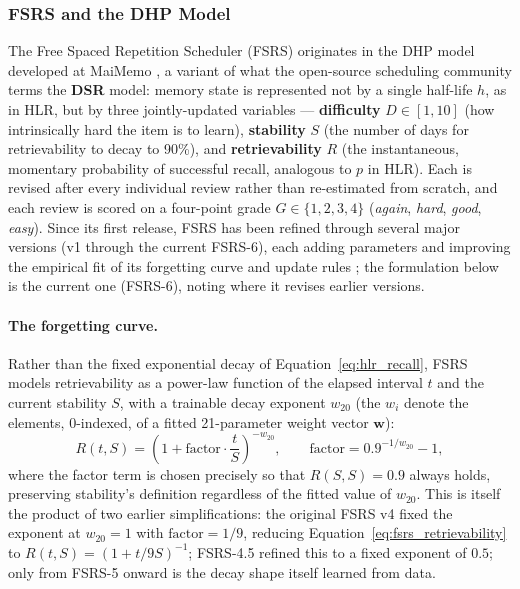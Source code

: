         \subsubsection{FSRS and the DHP Model}
        \label{subsubsec:fsrs}
        The Free Spaced Repetition Scheduler (FSRS) originates in the DHP model developed at MaiMemo \cite{ye2022stochastic}, a variant of what the open-source scheduling community terms the \textbf{DSR} model: memory state is represented not by a single half-life $h$, as in HLR, but by three jointly-updated variables --- \textbf{difficulty} $D \in [1, 10]$ (how intrinsically hard the item is to learn), \textbf{stability} $S$ (the number of days for retrievability to decay to 90\%), and \textbf{retrievability} $R$ (the instantaneous, momentary probability of successful recall, analogous to $p$ in HLR). Each is revised after every individual review rather than re-estimated from scratch, and each review is scored on a four-point grade $G \in \{1,2,3,4\}$ (\emph{again}, \emph{hard}, \emph{good}, \emph{easy}). Since its first release, FSRS has been refined through several major versions (v1 through the current FSRS-6), each adding parameters and improving the empirical fit of its forgetting curve and update rules \cite{opensr2026algorithm}; the formulation below is the current one (FSRS-6), noting where it revises earlier versions.

        \paragraph{The forgetting curve.} Rather than the fixed exponential decay of Equation~\ref{eq:hlr_recall}, FSRS models retrievability as a power-law function of the elapsed interval $t$ and the current stability $S$, with a trainable decay exponent $w_{20}$ (the $w_i$ denote the elements, $0$-indexed, of a fitted 21-parameter weight vector $\mathbf{w}$):
        \begin{equation}
            \label{eq:fsrs_retrievability}
            R(t, S) = \left(1 + \text{factor} \cdot \frac{t}{S}\right)^{-w_{20}}, \qquad \text{factor} = 0.9^{-1/w_{20}} - 1,
        \end{equation}
        where the factor term is chosen precisely so that $R(S, S) = 0.9$ always holds, preserving stability's definition regardless of the fitted value of $w_{20}$. This is itself the product of two earlier simplifications: the original FSRS v4 fixed the exponent at $w_{20}=1$ with $\text{factor}=1/9$, reducing Equation~\ref{eq:fsrs_retrievability} to $R(t,S) = (1 + t/9S)^{-1}$; FSRS-4.5 refined this to a fixed exponent of $0.5$; only from FSRS-5 onward is the decay shape itself learned from data.

